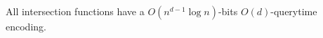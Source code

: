 \begin{lemma}[label=thm:intersection-d,restate=TheoremGPTIntersectionD]
  All intersection functions have a
  \(O(n^{d-1} \log n)\)-bits
  \(O(d)\)-querytime
  encoding.
\end{lemma}
